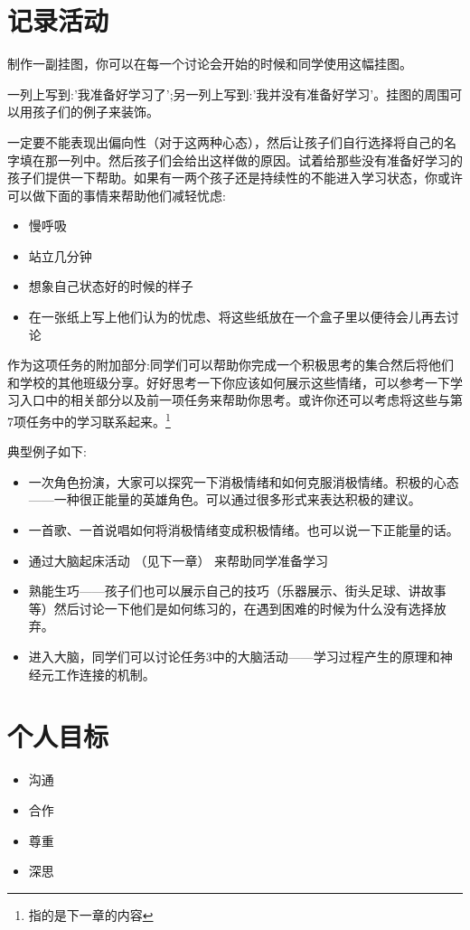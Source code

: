 \section{记录活动}
    制作一副挂图，你可以在每一个讨论会开始的时候和同学使用这幅挂图。\par
    一列上写到:'我准备好学习了';另一列上写到:'我并没有准备好学习'。挂图的周围可以用孩子们的例子来装饰。\par
    一定要不能表现出偏向性（对于这两种心态），然后让孩子们自行选择将自己的名字填在那一列中。然后孩子们会给出这样做的原因。试着给那些没有准备好学习的孩子们提供一下帮助。如果有一两个孩子还是持续性的不能进入学习状态，你或许可以做下面的事情来帮助他们减轻忧虑:\par
    \begin{itemize}
      \item 慢呼吸
      \item 站立几分钟
      \item 想象自己状态好的时候的样子 
      \item 在一张纸上写上他们认为的忧虑、将这些纸放在一个盒子里以便待会儿再去讨论  
    \end{itemize}  
    作为这项任务的附加部分:同学们可以帮助你完成一个积极思考的集合然后将他们和学校的其他班级分享。好好思考一下你应该如何展示这些情绪，可以参考一下学习入口中的相关部分以及前一项任务来帮助你思考。或许你还可以考虑将这些与第7项任务中的学习联系起来。\footnote{指的是下一章的内容}\par
    典型例子如下:\par
    \begin{itemize}
      \item 一次角色扮演，大家可以探究一下消极情绪和如何克服消极情绪。积极的心态——一种很正能量的英雄角色。可以通过很多形式来表达积极的建议。
      \item  一首歌、一首说唱如何将消极情绪变成积极情绪。也可以说一下正能量的话。
      \item  通过大脑起床活动 （见下一章） 来帮助同学准备学习
      \item  熟能生巧——孩子们也可以展示自己的技巧（乐器展示、街头足球、讲故事等）然后讨论一下他们是如何练习的，在遇到困难的时候为什么没有选择放弃。
      \item  进入大脑，同学们可以讨论任务3中的大脑活动——学习过程产生的原理和神经元工作连接的机制。
    \end{itemize}


\section{个人目标}
    \begin{itemize}
      \item 沟通
      \item 合作
      \item 尊重
      \item 深思  
    \end{itemize}  
